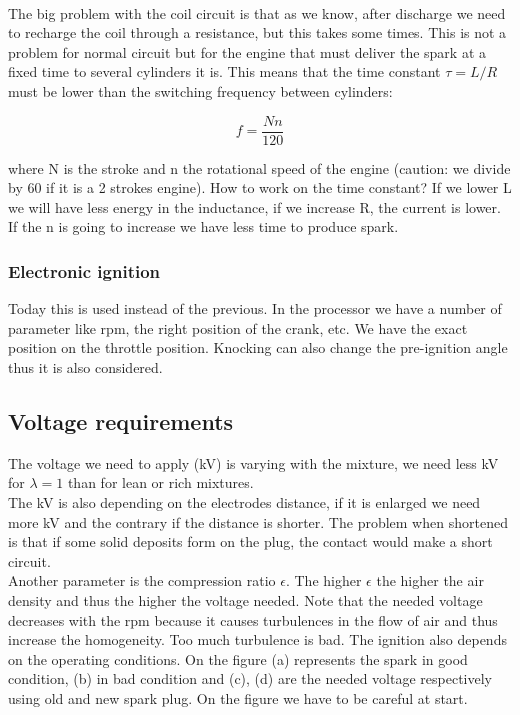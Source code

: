 	\ \\
	The big problem with the coil circuit is that as we know, after discharge we need to recharge the coil through a resistance, but this takes some times. This is not a problem for normal circuit but for the engine that must deliver the spark at a fixed time to several cylinders it is. This means that the time constant $\tau = L/R$ must be lower than the switching frequency between cylinders: 
	
	\begin{equation}
	f = \frac{Nn}{120}
	\end{equation}
	
	where N is the stroke and n the rotational speed of the engine (caution: we divide by 60 if it is a 2 strokes engine). How to work on the time constant? If we lower L we will have less energy in the inductance, if we increase R, the current is lower. If the n is going to increase we have less time to produce spark. 
	
\subsubsection{Electronic ignition}
Today this is used instead of the previous. In the processor we have a number of parameter like rpm, the right position of the crank, etc. We have the exact position on the throttle position. Knocking can also change the pre-ignition angle thus it is also considered. 

\subsection{Voltage requirements}
	The voltage we need to apply (kV) is varying with the mixture, we need less kV for $\lambda = 1$ than for lean or rich mixtures. \\
	
	The kV is also depending on the electrodes distance, if it is enlarged we need more kV and the contrary if the distance is shorter. The problem when shortened is that if some solid deposits form on the plug, the contact would make a short circuit. \\

	Another parameter is the compression ratio $\epsilon$. The higher $\epsilon$ the higher the air density and thus the higher the voltage needed. Note that the needed voltage decreases with the rpm because it causes turbulences in the flow of air and thus increase the homogeneity. Too much turbulence is bad. The ignition also depends on the operating conditions. On the figure (a) represents the spark in good condition, (b) in bad condition and (c), (d) are the needed voltage respectively using old and new spark plug. On the figure we have to be careful at start. 
	
